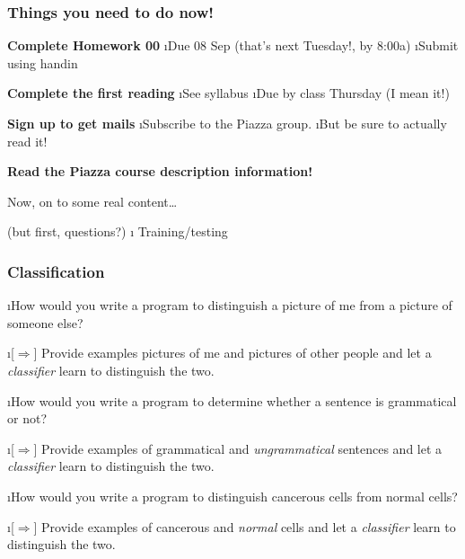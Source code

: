 \documentclass{beamer}
\newcommand{\blue}[1]{{\color{blue}#1}}
\newcommand{\green}[1]{{\color{DarkGreen}#1}}
\newcommand{\black}[1]{{\color{black}#1}}
\newcommand{\red}[1]{{\color{red}#1}}
\begin{document}
\begin{frame}
\frametitle{Things \red{you} need to do \red{now!}}

{\bf Complete Homework 00}
\bei
\i Due 08 Sep (that's \red{next Tuesday!}, by 8:00a)
\i Submit using \blue{handin}
\eni

\vspace{2em}
{\bf Complete the first reading}
\bei
\i See syllabus
\i Due by class Thursday (I mean it!)
\eni

\vspace{2em}
{\bf Sign up to get mails}
\bei
\i Subscribe to the Piazza group.
\i But be sure to actually read it!
\eni

\vspace{2em}
{\bf Read the Piazza course description information!}

\end{frame}


\begin{frame}
\begin{center}
\blue{\huge Now, on to some \black{real} content\dots}
\end{center}
\hspace{20em}(but first, questions?)
\bei
\i<2-> Training/testing
\eni
\end{frame}



\begin{frame}
\frametitle{Classification}

\bei

\i How would you write a program to distinguish a \green{picture} of
\red{me} from a picture of \blue{someone else}?

\bei
\i<2->[$\Rightarrow$] Provide examples pictures of \red{me} and
pictures of \blue{other people} and let a \emph{classifier} learn to
distinguish the two.
\eni

\i How would you write a program to determine whether a
\green{sentence} is \red{grammatical} or \blue{not}?

\bei
\i<3->[$\Rightarrow$] Provide examples of \red{grammatical} and
\emph{ungrammatical} sentences and let a \emph{classifier} learn to
distinguish the two.
\eni

\i How would you write a program to distinguish \red{cancerous}
\green{cells} from \blue{normal} \green{cells}?

\bei
\i<4->[$\Rightarrow$] Provide examples of \red{cancerous} and
\emph{normal} cells and let a \emph{classifier} learn to distinguish
the two.
\eni
\eni
\end{frame}
\end{document}
